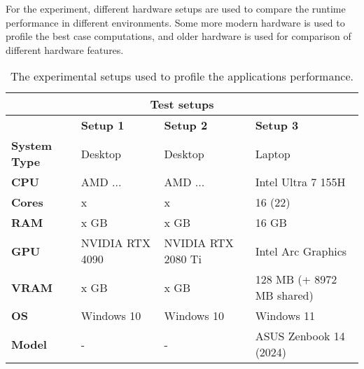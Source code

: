 For the experiment, different hardware setups are used to compare the runtime performance in different environments.
Some more modern hardware is used to profile the best case computations, and older hardware is used for comparison of 
different hardware features. 

\begin{table}[h]
    \begin{tabular}{|llll|}
        \hline
        \multicolumn{4}{|c|}{\textbf{Test setups}}                                                                                                               \\ \hline
        \multicolumn{1}{|l|}{}                     & \multicolumn{1}{l|}{\textbf{Setup 1}} & \multicolumn{1}{l|}{\textbf{Setup 2}}   & \textbf{Setup 3}          \\ \hline
        \multicolumn{1}{|l|}{\textbf{System Type}} & \multicolumn{1}{l|}{Desktop}          & \multicolumn{1}{l|}{Desktop}            & Laptop                    \\
        \multicolumn{1}{|l|}{\textbf{CPU}}         & \multicolumn{1}{l|}{AMD ...}          & \multicolumn{1}{l|}{AMD ...}            & Intel Ultra 7 155H        \\
        \multicolumn{1}{|l|}{\textbf{Cores}}       & \multicolumn{1}{l|}{x}                & \multicolumn{1}{l|}{x}                  & 16 (22)                   \\
        \multicolumn{1}{|l|}{\textbf{RAM}}         & \multicolumn{1}{l|}{x GB}             & \multicolumn{1}{l|}{x GB}               & 16 GB                     \\
        \multicolumn{1}{|l|}{\textbf{GPU}}         & \multicolumn{1}{l|}{NVIDIA RTX 4090}  & \multicolumn{1}{l|}{NVIDIA RTX 2080 Ti} & Intel Arc Graphics        \\
        \multicolumn{1}{|l|}{\textbf{VRAM}}        & \multicolumn{1}{l|}{x GB}             & \multicolumn{1}{l|}{x GB}               & 128 MB (+ 8972 MB shared) \\
        \multicolumn{1}{|l|}{\textbf{OS}}          & \multicolumn{1}{l|}{Windows 10}       & \multicolumn{1}{l|}{Windows 10}         & Windows 11                \\
        \multicolumn{1}{|l|}{\textbf{Model}}       & \multicolumn{1}{l|}{-}                & \multicolumn{1}{l|}{-}                  & ASUS Zenbook 14 (2024)    \\ \hline
    \end{tabular}
    \caption{The experimental setups used to profile the applications performance.}
    \label{tbl:hardware-setup}
\end{table}


